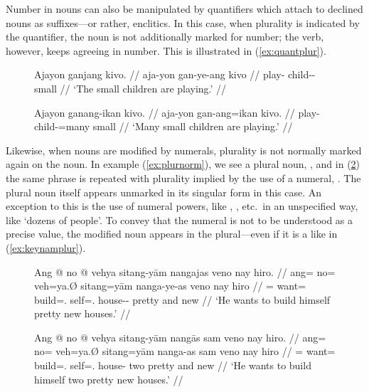 Number in nouns can also be manipulated by quantifiers which attach to declined
nouns as suffixes---or rather, enclitics. In this case, when plurality is
indicated by the quantifier, the noun is not additionally marked for number;
the verb, however, keeps agreeing in number. This is illustrated in
(\ref{ex:quantplur}).

\begin{figure}[h]
\pex\label{ex:quantplur}
\a\begingl
	\gla Ajayon ganjang kivo. //
	\glb aja-yon gan-ye-ang kivo //
	\glc play-\TplN{} child-\Pl{}-\Aarg{} small //
	\glft `The small children are playing.' //
\endgl
	
\a\label{ex:nounquant}\begingl
	\gla Ajayon ganang-ikan kivo. //
	\glb aja-yon gan-ang=ikan kivo. //
	\glc play-\TplN{} child-\Aarg{}=many small //
	\glft `Many small children are playing.' //
\endgl
\xe
\end{figure}

Likewise, when nouns are modified by numerals, plurality is not
normally marked again on the noun. In example (\ref{ex:plurnorm}), we see a
plural noun, , and in (\ref{ex:plurnum}) the same phrase
is repeated with plurality implied by the use of a numeral,
. The plural noun itself appears unmarked in its singular
form in this case. An exception to this is the use of numeral powers, like
, , etc.\ in an unspecified
way, like `dozens of people'. To convey that the numeral is not to be
understood as a precise value, the modified noun appears in the plural---even
if it is a  like  in
(\ref{ex:keynamplur}).

\begin{figure}[h]
\pex
\a\label{ex:plurnorm}\begingl
	\gla Ang @ no @ vehya sitang-yām nangajas veno nay hiro. //
	\glb ang= no= veh=ya.Ø sitang=yām nanga-ye-as veno nay hiro //
	\glc \AgtT{}= want= build=\TsgM.\Top{} self=\TsgM{}.\Dat{} 
		house-\Pl{}-\Parg{} pretty and new //
	\glft `He wants to build himself pretty new houses.' //
\endgl

\a\label{ex:plurnum}\begingl
	\gla Ang @ no @ vehya sitang-yām nangās sam veno nay hiro. //
	\glb ang= no= veh=ya.Ø sitang=yām nanga-as sam veno nay hiro //
	\glc \AgtT{}= want= build=\TsgM.\Top{} self=\TsgM{}.\Dat{} house-\Parg{} 
		two pretty and new //
	\glft `He wants to build himself two pretty new houses.' //
\endgl
\xe
\end{figure}

